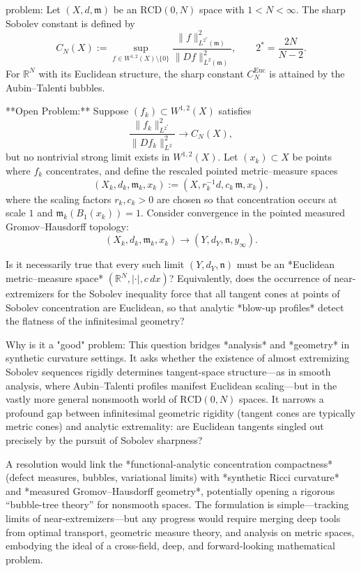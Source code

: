 problem:  
Let \((X,d,\mathfrak{m})\) be an \(\mathrm{RCD}(0,N)\) space with \(1<N<\infty\).  
The sharp Sobolev constant is defined by  
\[
C_{N}(X) := 
\sup_{f \in W^{1,2}(X) \setminus \{0\}}
\frac{\|f\|_{L^{2^*}(\mathfrak{m})}^2}{\|Df\|_{L^2(\mathfrak{m})}^2},
\qquad
2^* = \frac{2N}{N-2}.
\]
For \(\mathbb{R}^N\) with its Euclidean structure, the sharp constant \(C_N^{\mathrm{Euc}}\) is attained by the Aubin–Talenti bubbles.  

**Open Problem:**  
Suppose \((f_k)\subset W^{1,2}(X)\) satisfies  
\[
\frac{\|f_k\|_{L^{2^*}}^2}{\|Df_k\|_{L^2}^2} \to C_{N}(X),
\]
but no nontrivial strong limit exists in \(W^{1,2}(X)\).  
Let \((x_k)\subset X\) be points where \(f_k\) concentrates, and define the rescaled pointed metric–measure spaces
\[
(X_k, d_k, \mathfrak{m}_k, x_k)
:= (X, r_k^{-1} d, c_k\,\mathfrak{m}, x_k),
\]
where the scaling factors \(r_k,c_k>0\) are chosen so that concentration occurs at scale \(1\) and \(\mathfrak{m}_k(B_1(x_k))=1\).  
Consider convergence in the pointed measured Gromov–Hausdorff topology:
\[
(X_k, d_k, \mathfrak{m}_k, x_k) \to (Y,d_Y,\mathfrak{n},y_\infty).
\]

Is it necessarily true that every such limit \((Y,d_Y,\mathfrak{n})\) must be an *Euclidean metric–measure space* \((\mathbb{R}^N, |\cdot|, c\,dx)\)?  
Equivalently, does the occurrence of near-extremizers for the Sobolev inequality force that all tangent cones at points of Sobolev concentration are Euclidean, so that analytic *blow-up profiles* detect the flatness of the infinitesimal geometry?  

Why is it a "good" problem:  
This question bridges *analysis* and *geometry* in synthetic curvature settings. It asks whether the existence of almost extremizing Sobolev sequences rigidly determines tangent-space structure—as in smooth analysis, where Aubin–Talenti profiles manifest Euclidean scaling—but in the vastly more general nonsmooth world of \(\mathrm{RCD}(0,N)\) spaces.  
It narrows a profound gap between infinitesimal geometric rigidity (tangent cones are typically metric cones) and analytic extremality: are Euclidean tangents singled out precisely by the pursuit of Sobolev sharpness?  

A resolution would link the *functional-analytic concentration compactness* (defect measures, bubbles, variational limits) with *synthetic Ricci curvature* and *measured Gromov–Hausdorff geometry*, potentially opening a rigorous “bubble-tree theory” for nonsmooth spaces.  
The formulation is simple—tracking limits of near-extremizers—but any progress would require merging deep tools from optimal transport, geometric measure theory, and analysis on metric spaces, embodying the ideal of a cross-field, deep, and forward-looking mathematical problem.